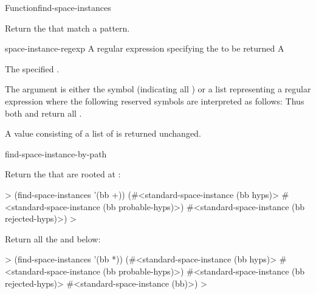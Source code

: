 \documentclass[10pt,twoside,english,pdftex]{article}
\begin{document}

\begin{functiondoc}{Function}{find-space-instances}%
  {
    }

\fnsyntax

\fnpurpose Return the  that match a
 pattern.

\fnpackage {}

\fnmodule {}

\fnargs
\begin{args}{space-instance-regexp}
 A  regular expression
specifying the  to be returned 
 A 
\end{args}

\fnreturns The specified .

\fndescription 
{}%
The  argument is either the symbol
 (indicating all ) or a list
representing a regular expression where the following reserved symbols
are interpreted as follows: 
\spaceinstanceregexp
Thus both  and
 return all .

A  value consisting of a list of
 is returned unchanged.

\begin{alsos}{find-space-instance-by-path}
\end{alsos}

\fnexamples
Return the  that are rooted at :
%
\W\supp
\begin{example}
  > (find-space-instances '(bb +))
  (#<standard-space-instance (bb hyps)>
   #<standard-space-instance (bb probable-hyps)>)
   #<standard-space-instance (bb rejected-hyps)>)
  >
\end{example}
%
Return all the   and below:
%
\W\supp\notpretop
\begin{example}
  > (find-space-instances '(bb *))
  (#<standard-space-instance (bb hyps)>
   #<standard-space-instance (bb probable-hyps)>)
   #<standard-space-instance (bb rejected-hyps)>
   #<standard-space-instance (bb)>)
  >
\end{example}

\end{functiondoc}
\end{document}

